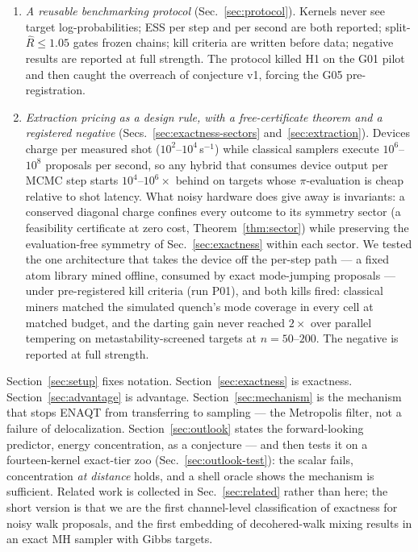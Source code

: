 \documentclass[aps,prx,reprint,floatfix,amsmath,amssymb,amsfonts]{revtex4-2}
\begin{document}
\begin{enumerate}
\item \emph{A reusable benchmarking protocol} (Sec.~\ref{sec:protocol}).
Kernels never see target log-probabilities; ESS per step and per second
are both reported; split-$\hat R\le 1.05$ gates frozen chains; kill
criteria are written before data; negative results are reported at full
strength. The protocol killed H1 on the G01 pilot and then caught the
overreach of conjecture v1, forcing the G05 pre-registration.

\item \emph{Extraction pricing as a design rule, with a free-certificate
theorem and a registered negative} (Secs.~\ref{sec:exactness-sectors}
and~\ref{sec:extraction}). Devices charge per measured shot
($10^{2}$--$10^{4}$\,s$^{-1}$) while classical samplers execute
$10^{6}$--$10^{8}$ proposals per second, so any hybrid that consumes
device output per MCMC step starts $10^{4}$--$10^{6}\times$ behind on
targets whose $\pi$-evaluation is cheap relative to shot latency. What
noisy hardware does give away is invariants: a conserved diagonal
charge confines every outcome to its symmetry sector (a feasibility
certificate at zero cost, Theorem~\ref{thm:sector}) while preserving
the evaluation-free symmetry of Sec.~\ref{sec:exactness} within each
sector. We tested the one architecture that takes the device off the
per-step path --- a fixed atom library mined offline, consumed by exact
mode-jumping proposals --- under pre-registered kill criteria (run
P01), and both kills fired: classical miners matched the simulated
quench's mode coverage in every cell at matched budget, and the darting
gain never reached $2\times$ over parallel tempering on
metastability-screened targets at $n=50$--$200$. The negative is
reported at full strength.
\end{enumerate}

Section~\ref{sec:setup} fixes notation. Section~\ref{sec:exactness} is
exactness. Section~\ref{sec:advantage} is advantage.
Section~\ref{sec:mechanism} is the mechanism that stops ENAQT from
transferring to sampling --- the Metropolis filter, not a failure of
delocalization. Section~\ref{sec:outlook} states the forward-looking
predictor, energy concentration, as a conjecture --- and then tests it
on a fourteen-kernel exact-tier zoo (Sec.~\ref{sec:outlook-test}): the
scalar fails, concentration \emph{at distance} holds, and a shell
oracle shows the mechanism is sufficient. Related work is collected in Sec.~\ref{sec:related} rather
than here; the short version is that we are the first channel-level
classification of exactness for noisy walk proposals, and the first
embedding of decohered-walk mixing results in an exact MH sampler with
Gibbs targets.
\end{document}
